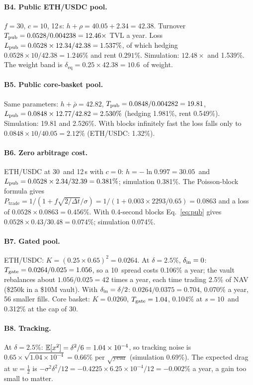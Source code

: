 \paragraph{B4. Public ETH/USDC pool.} $f=30$, $c=10$\bps, 12\,s: $h+\rho=40.05+2.34=42.38$\bps. Turnover $T_{\mathrm{pub}}=0.0528/0.004238=12.46\times$ TVL a year. Loss $L_{\mathrm{pub}}=0.0528\times12.34/42.38=1.537\%$, of which hedging $0.0528\times10/42.38=1.246\%$ and rent $0.291\%$. Simulation: $12.48\times$ and 1.539\%. The weight band is $\delta_{\mathrm{eq}}=0.25\times42.38=10.6$\bps\ of weight.

\paragraph{B5. Public core-basket pool.} Same parameters: $h+\bar\rho=42.82$\bps, $T_{\mathrm{pub}}=0.0848/0.004282=19.81$, $L_{\mathrm{pub}}=0.0848\times12.77/42.82=2.530\%$ (hedging 1.981\%, rent 0.549\%). Simulation: 19.81 and 2.526\%. With blocks infinitely fast the loss falls only to $0.0848\times10/40.05=2.12\%$ (ETH/USDC: 1.32\%).

\paragraph{B6. Zero arbitrage cost.} ETH/USDC at 30\bps\ and 12\,s with $c=0$: $h=-\ln0.997=30.05$\bps\ and $L_{\mathrm{pub}}=0.0528\times2.34/32.39=0.381\%$; simulation 0.381\%. The Poisson-block formula \cite{lvrfees} gives $P_{\mathrm{trade}}=1/(1+f\sqrt{2/\Delta t}/\sigma)=1/(1+0.003\times2293/0.65)=0.0863$ and a loss of $0.0528\times0.0863=0.456\%$. With 0.4-second blocks Eq.~\eqref{eq:pub} gives $0.0528\times0.43/30.48=0.074\%$; simulation 0.074\%.

\paragraph{B7. Gated pool.} ETH/USDC: $K=(0.25\times0.65)^2=0.0264$. At $\delta=2.5\%$, $\delta_{\mathrm{in}}=0$: $T_{\mathrm{gate}}=0.0264/0.025=1.056$, so a 10\bps\ spread costs 0.106\% a year; the vault rebalances about $1.056/0.025=42$ times a year, each time trading 2.5\% of NAV (\$250k in a \$10M vault). With $\delta_{\mathrm{in}}=\delta/2$: $0.0264/0.0375=0.704$, 0.070\% a year, 56 smaller fills. Core basket: $K=0.0260$, $T_{\mathrm{gate}}=1.04$, 0.104\% at $s=10$\bps\ and 0.312\% at the cap of 30\bps.

\paragraph{B8. Tracking.} At $\delta=2.5\%$: $\mathbb{E}[x^2]=\delta^2/6=1.04\times10^{-4}$, so tracking noise is $0.65\times\sqrt{1.04\times10^{-4}}=0.66\%$ per $\sqrt{\text{year}}$ (simulation 0.69\%). The expected drag at $w=\tfrac12$ is $-\sigma^2\delta^2/12=-0.4225\times6.25\times10^{-4}/12=-0.002\%$ a year, a gain too small to matter.

